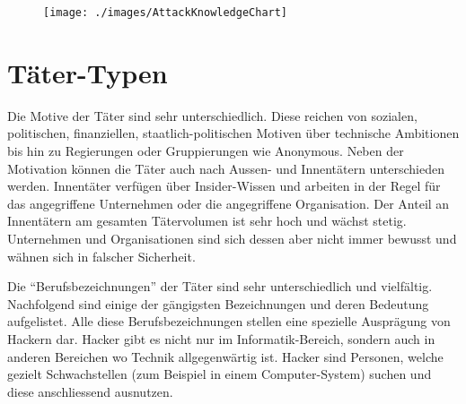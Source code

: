 \begin{figure}[t]
  \centering
  \texttt{[image: ./images/AttackKnowledgeChart]}
\end{figure}


\section{Täter-Typen}
Die Motive der Täter sind sehr unterschiedlich. Diese reichen von sozialen, politischen, finanziellen, staatlich-politischen Motiven über technische Ambitionen bis hin zu Regierungen oder Gruppierungen wie Anonymous. Neben der Motivation können die Täter auch nach Aussen- und Innentätern unterschieden werden. Innentäter verfügen über Insider-Wissen und arbeiten in der Regel für das angegriffene Unternehmen oder die angegriffene Organisation. Der Anteil an Innentätern am gesamten Tätervolumen ist sehr hoch und wächst stetig. Unternehmen und Organisationen sind sich dessen aber nicht immer bewusst und wähnen sich in falscher Sicherheit.

Die "`Berufsbezeichnungen"' der Täter sind sehr unterschiedlich und vielfältig. Nachfolgend sind einige der gängigsten Bezeichnungen und deren Bedeutung aufgelistet. Alle diese Berufsbezeichnungen stellen eine spezielle Ausprägung von Hackern dar. Hacker gibt es nicht nur im Informatik-Bereich, sondern auch in anderen Bereichen wo Technik allgegenwärtig ist. Hacker sind Personen, welche gezielt Schwachstellen (zum Beispiel in einem Computer-System) suchen und diese anschliessend ausnutzen. 

